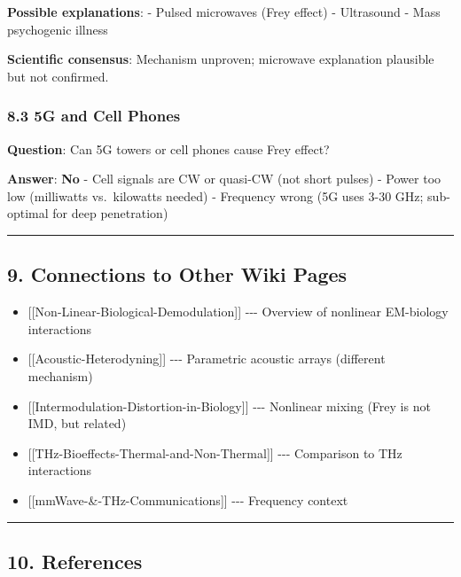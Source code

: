 \textbf{Possible explanations}: - Pulsed microwaves (Frey effect) -
Ultrasound - Mass psychogenic illness

\textbf{Scientific consensus}: Mechanism unproven; microwave explanation
plausible but not confirmed.

\subsubsection{8.3 5G and Cell Phones}\label{g-and-cell-phones}

\textbf{Question}: Can 5G towers or cell phones cause Frey effect?

\textbf{Answer}: \textbf{No} - Cell signals are CW or quasi-CW (not
short pulses) - Power too low (milliwatts vs.~kilowatts needed) -
Frequency wrong (5G uses 3-30 GHz; sub-optimal for deep penetration)

\begin{center}\rule{0.5\linewidth}{0.5pt}\end{center}

\subsection{9. Connections to Other Wiki
Pages}\label{connections-to-other-wiki-pages}

\begin{itemize}
\tightlist
\item
  {[}{[}Non-Linear-Biological-Demodulation{]}{]} -\/-\/- Overview of
  nonlinear EM-biology interactions
\item
  {[}{[}Acoustic-Heterodyning{]}{]} -\/-\/- Parametric acoustic arrays
  (different mechanism)
\item
  {[}{[}Intermodulation-Distortion-in-Biology{]}{]} -\/-\/- Nonlinear
  mixing (Frey is not IMD, but related)
\item
  {[}{[}THz-Bioeffects-Thermal-and-Non-Thermal{]}{]} -\/-\/- Comparison
  to THz interactions
\item
  {[}{[}mmWave-\&-THz-Communications{]}{]} -\/-\/- Frequency context
\end{itemize}

\begin{center}\rule{0.5\linewidth}{0.5pt}\end{center}

\subsection{10. References}\label{references}

